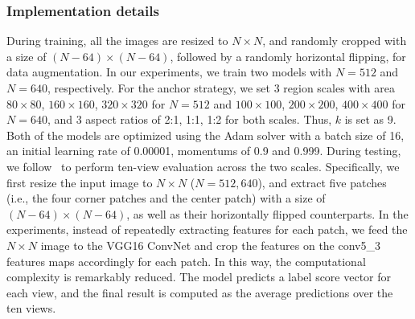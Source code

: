 \documentclass[letterpaper]{article} %
\begin{document}
\subsubsection{Implementation details}
During training, all the images are resized to $N\times{N}$, and randomly cropped with a size of $(N-64)\times(N-64)$, followed by a randomly horizontal flipping, for data augmentation. In our experiments, we train two models with $N=512$ and $N=640$, respectively. For the anchor strategy, we set 3 region scales with area $80\times{80}$, $160\times{160}$, $320\times{320}$ for $N=512$ and $100\times{100}$, $200\times{200}$, $400\times{400}$ for $N=640$, and 3 aspect ratios of 2:1, 1:1, 1:2 for both scales. Thus, $k$ is set as 9. Both of the models are optimized using the Adam solver with a batch size of 16, an initial learning rate of 0.00001, momentums of 0.9 and 0.999. During testing, we follow~\cite{krizhevsky2012imagenet} to perform ten-view evaluation across the two scales. Specifically, we first resize the input image to $N\times{N}$ ($N=512, 640$), and extract five patches (i.e., the four corner patches and the center patch) with a size of $(N-64)\times(N-64)$, as well as their horizontally flipped counterparts. In the experiments, instead of repeatedly extracting features for each patch, we feed the $N\times{N}$ image to the VGG16 ConvNet and crop the features on the conv5\_3 features maps accordingly for each patch. In this way, the computational complexity is remarkably reduced. The model predicts a label score vector for each view, and the final result is computed as the average predictions over the ten views.
\end{document}
